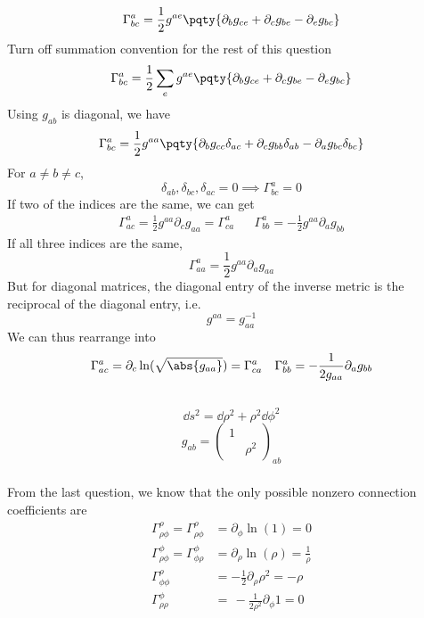 \documentclass[12pt]{article}
\begin{document}
    \subsubsection{} { \[
        \Gamma^{a}_{bc} = \frac{1}{2}g^{ae} \pqty{\partial_b g_{ce} + \partial_c g_{be} - \partial_eg_{bc}}
    \]}
    Turn off summation convention for the rest of this question \[
        \Gamma^{a}_{bc} = \frac{1}{2}\sum_e g^{ae} \pqty{\partial_b g_{ce} + \partial_c g_{be} - \partial_eg_{bc}}
    \]
    Using \(g_{ab}\) is diagonal, we have \[
        \Gamma^{a}_{bc} = \frac{1}{2} g^{aa} \pqty{\partial_b g_{cc}\delta_{ac} + \partial_c g_{bb}\delta_{ab} - \partial_a g_{bc} \delta_{bc}}
    \]
    For \(a\neq b\neq c\), \[
        \delta_{ab},\delta_{bc},\delta_{ac} = 0 \implies \Gamma^{a}_{bc} = 0
    \]
    If two of the indices are the same, we can get
    \begin{align*}
        \Gamma^{a}_{ac} = \frac{1}{2} g^{aa}  \partial_c g_{aa} = \Gamma^a_{ca} &  & \Gamma^a_{bb} = -\frac{1}{2}g^{aa} \partial_ag_{bb}
    \end{align*}
    If all three indices are the same, \[
        \Gamma^a_{aa} = \frac{1}{2}g^{aa} \partial_ag_{aa}
    \]
    But for diagonal matrices, the diagonal entry of the inverse metric is the reciprocal of the diagonal entry, i.e.\[
        g^{aa} = g_{aa}^{-1}
    \]
    We can thus rearrange into \begin{align*}
        \Gamma^{a}_{ac} = \partial_c \ln(\sqrt{\abs{g_{aa}}}) = \Gamma^a_{ca} &  & \Gamma^a_{bb} = -\frac{1}{2g_{aa}} \partial_ag_{bb}
    \end{align*}
    \subsection{} { \[
        \dd s^2 = \dd \rho^2 +\rho^2 \dd \phi^2
    \]
    \[
        g_{ab} = \begin{pmatrix} 1&\\&\rho^2 \end{pmatrix}_{ab}
    \]}
    \subsubsection{} From the last question, we know that the only possible nonzero connection coefficients are
    \begin{align*}
        \Gamma^\rho_{\rho \phi } = \Gamma^\rho_{\rho \phi } & = \partial_\phi  \ln(1) = 0                  \\
        \Gamma^\phi_{\rho \phi } = \Gamma^\phi_{\phi \rho } & = \partial_\rho \ln(\rho) = \frac{1}{\rho}   \\
        \Gamma^\rho_{\phi \phi }                            & =  -\frac{1}{2}\partial_\rho \rho^2 = - \rho \\
        \Gamma^\phi _{\rho \rho }                           & =\, -\frac{1}{2\rho^2}\partial_\phi 1= 0
    \end{align*}
\end{document}
